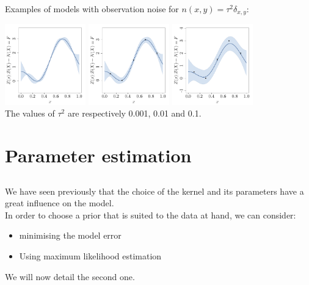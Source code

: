 \documentclass{beamer}
\begin{document}
\begin{frame}{}
Examples of models with observation noise for $n(x,y)=\tau^2 \delta_{x,y}$:
\begin{center}
\includegraphics[height=3.5cm]{figures/R/ch34_GPRnoise0001}
\includegraphics[height=3.5cm]{figures/R/ch34_GPRnoise001}
\includegraphics[height=3.5cm]{figures/R/ch34_GPRnoise01}\\
The values of $\tau^2$ are respectively 0.001, 0.01 and 0.1.
\end{center}
\end{frame}

\section[Param. estim.]{Parameter estimation}
\subsection{}

\begin{frame}{}
We have seen previously that the choice of the kernel and its parameters have a great influence on the model. \\ \vspace{5mm}
In order to choose a prior that is suited to the data at hand, we can consider:
\begin{itemize}
	\item minimising the model error
	\item Using maximum likelihood estimation
\end{itemize}
We will now detail the second one.
\end{frame}
\end{document}
